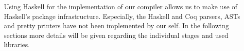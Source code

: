 %
%
%
%
%
%

Using Haskell for the implementation of our compiler allows us to make use of Haskell's package infrastructure.
Especially, the Haskell and Coq parsers, ASTs and pretty printers have not been implemented by our self.
In the following sections more details will be given regarding the individual stages and used libraries.
